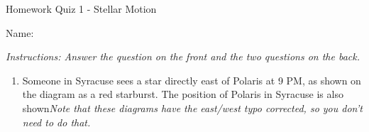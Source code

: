 \documentclass[12pt]{article}
\begin{document}
\begin{center}
	\Large \sc Homework Quiz 1 - Stellar Motion
\end{center}

\begin{flushright}
	Name: \underline{\hspace{4in}}
\end{flushright}

\it Instructions: Answer the question on the front and the two questions on the back. 

\rm
	
	\begin{enumerate}
		\item Someone in Syracuse sees a star directly east of Polaris at 9 PM, as shown on the diagram as a red starburst.  The position of Polaris in Syracuse is also shown{\it Note that these diagrams have the east/west typo corrected, so you don't need to do that.} 
		

\end{enumerate}
\end{document}
